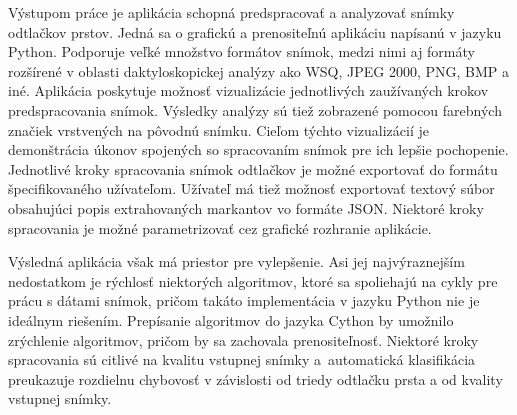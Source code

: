   Výstupom práce je aplikácia schopná predspracovať a analyzovať snímky odtlačkov prstov. Jedná sa o grafickú a prenositeľnú aplikáciu napísanú v jazyku
  Python. Podporuje veľké množstvo formátov snímok, medzi nimi aj formáty rozšírené v oblasti daktyloskopickej analýzy ako WSQ, JPEG 2000, PNG, BMP a iné.
  Aplikácia poskytuje možnosť vizualizácie jednotlivých zaužívaných krokov predspracovania snímok. Výsledky analýzy sú tiež zobrazené pomocou farebných
  značiek vrstvených na pôvodnú snímku. Cieľom týchto vizualizácií je demonštrácia úkonov spojených so spracovaním snímok pre ich lepšie pochopenie.
  Jednotlivé kroky spracovania snímok odtlačkov je možné exportovať do formátu špecifikovaného užívateľom.
  Užívateľ má tiež možnosť exportovať textový súbor obsahujúci popis extrahovaných markantov vo formáte JSON.
  Niektoré kroky spracovania je možné parametrizovať cez grafické rozhranie aplikácie.

  Výsledná aplikácia však má priestor pre vylepšenie. Asi jej najvýraznejším nedostatkom je rýchlosť niektorých algoritmov, ktoré sa spoliehajú na
  cykly pre prácu s dátami snímok, pričom takáto implementácia v jazyku Python nie je ideálnym riešením. Prepísanie algoritmov do jazyka Cython by umožnilo
  zrýchlenie algoritmov, pričom by sa zachovala prenositeľnosť. Niektoré kroky spracovania sú citlivé na kvalitu vstupnej snímky a~automatická
  klasifikácia preukazuje rozdielnu chybovosť v závislosti od triedy odtlačku prsta a od kvality vstupnej snímky.
